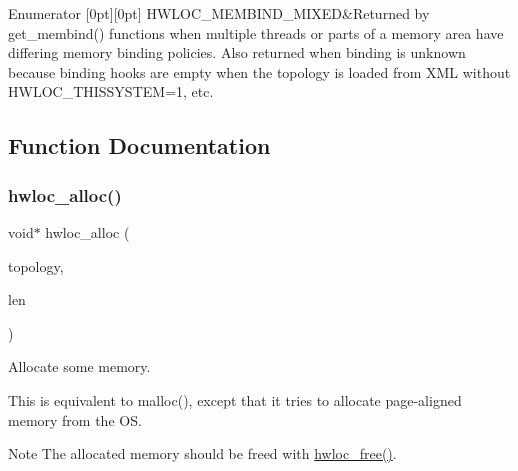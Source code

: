 \begin{DoxyEnumFields}{Enumerator}
[0pt][0pt]{}\mbox{\label{a00191_ggac9764f79505775d06407b40f5e4661e8a3185bd869b67817fb2bd5164bf360402}} 
H\+W\+L\+O\+C\+\_\+\+M\+E\+M\+B\+I\+N\+D\+\_\+\+M\+I\+X\+ED&Returned by get\+\_\+membind() functions when multiple threads or parts of a memory area have differing memory binding policies. Also returned when binding is unknown because binding hooks are empty when the topology is loaded from X\+ML without H\+W\+L\+O\+C\+\_\+\+T\+H\+I\+S\+S\+Y\+S\+T\+EM=1, etc. \\
\hline

\end{DoxyEnumFields}


\subsection{Function Documentation}
\mbox{\label{a00191_ga972b335a86a7d5e7b34bce2b243c41bc}} 
\subsubsection{\texorpdfstring{hwloc\+\_\+alloc()}{hwloc\_alloc()}}
{\footnotesize\ttfamily void$\ast$ hwloc\+\_\+alloc (\begin{DoxyParamCaption}\item[{\hyperlink{a00186_ga9d1e76ee15a7dee158b786c30b6a6e38}{hwloc\+\_\+topology\+\_\+t}}]{topology,  }\item[{size\+\_\+t}]{len }\end{DoxyParamCaption})}



Allocate some memory. 

This is equivalent to malloc(), except that it tries to allocate page-\/aligned memory from the OS.

\begin{DoxyNote}{Note}
The allocated memory should be freed with \hyperlink{a00191_ga32dbd4f54e9e4a7179f2dde37ffe6ad7}{hwloc\+\_\+free()}. 
\end{DoxyNote}
\mbox{\label{a00191_ga04736461780fadcf193af218c0122273}} 
